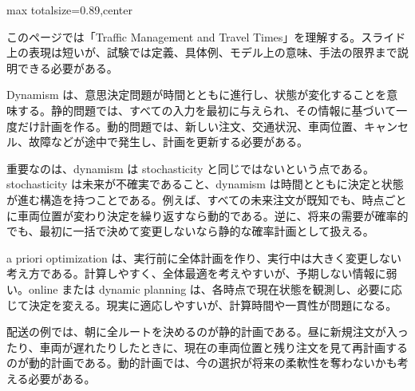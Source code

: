 \begin{minipage}[t]{0.58\textwidth}
\begin{adjustbox}{max totalsize={\textwidth}{0.89\textheight},center}
\begin{minipage}{\textwidth}\scriptsize
{}このページでは「Traffic Management and Travel Times」を理解する。スライド上の表現は短いが、試験では定義、具体例、モデル上の意味、手法の限界まで説明できる必要がある。\par
Dynamism は、意思決定問題が時間とともに進行し、状態が変化することを意味する。静的問題では、すべての入力を最初に与えられ、その情報に基づいて一度だけ計画を作る。動的問題では、新しい注文、交通状況、車両位置、キャンセル、故障などが途中で発生し、計画を更新する必要がある。\par
重要なのは、dynamism は stochasticity と同じではないという点である。stochasticity は未来が不確実であること、dynamism は時間とともに決定と状態が進む構造を持つことである。例えば、すべての未来注文が既知でも、時点ごとに車両位置が変わり決定を繰り返すなら動的である。逆に、将来の需要が確率的でも、最初に一括で決めて変更しないなら静的な確率計画として扱える。\par
a priori optimization は、実行前に全体計画を作り、実行中は大きく変更しない考え方である。計算しやすく、全体最適を考えやすいが、予期しない情報に弱い。online または dynamic planning は、各時点で現在状態を観測し、必要に応じて決定を変える。現実に適応しやすいが、計算時間や一貫性が問題になる。\par
配送の例では、朝に全ルートを決めるのが静的計画である。昼に新規注文が入ったり、車両が遅れたりしたときに、現在の車両位置と残り注文を見て再計画するのが動的計画である。動的計画では、今の選択が将来の柔軟性を奪わないかも考える必要がある。\par

\end{minipage}
\end{adjustbox}
\end{minipage}

